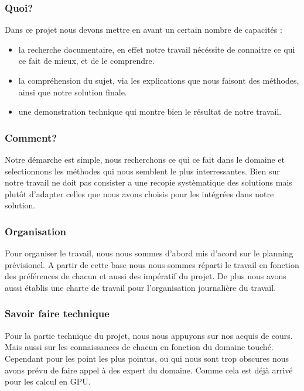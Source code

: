 \documentclass[a4paper,10pt]{article}
\begin{document}
\subsubsection{Quoi?}
Dans ce projet nous devons mettre en avant un certain nombre de capacités :
\begin{itemize}
\item la recherche documentaire, en effet notre travail nécéssite de
  connaitre ce qui ce fait de mieux, et de le comprendre.
\item la compréhension du sujet, via les explications que nous faisont
  des méthodes, ainsi que notre solution finale.
\item une demonstration technique qui montre bien le résultat de notre
  travail.
\end{itemize}

\subsubsection{Comment?}
Notre démarche est simple, nous recherchons ce qui ce fait dans le
domaine et selectionnons les méthodes qui nous semblent le plus
interressantes. Bien sur notre travail ne doit pas consister a une
recopie systèmatique des solutions mais plutôt d'adapter celles que
nous avons choisis pour les intégrées dans notre solution.\\

\subsubsection{Organisation}
Pour organiser le travail, nous nous sommes d'abord mis d'acord sur le
planning prévisionel. A partir de cette base nous nous sommes réparti
le travail en fonction des préférences de chacun et aussi des
impératif du projet. De plus nous avons aussi établis une charte de
travail pour l'organisation journalière du travail.\\

\subsubsection{Savoir faire technique}
Pour la partie technique du projet, nous nous appuyons sur nos acquis
de cours. Mais aussi sur les connaissances de chacun en fonction du
domaine touché.\\ Cependant pour les point les plus pointus, ou qui
nous sont trop obscures nous avons prévu de faire appel à des expert
du domaine. Comme cela est déjà arrivé pour les calcul en GPU.
\end{document}
